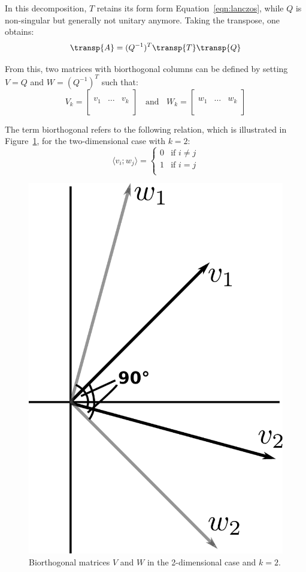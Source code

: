 \noindent In this decomposition, $T$ retains its form form Equation~\hyperref[eqn:lanczos]{\ref{eqn:lanczos}}, while $Q$ is non-singular but generally not unitary anymore. Taking the transpose, one obtains:
\begin{equation}
    \transp{A} = (Q^{-1})^T\transp{T}\transp{Q}
\end{equation}

\noindent From this, two matrices with biorthogonal columns can be defined by setting $V=Q$ and $W=(Q^{-1})^T$ such that:
\begin{equation}
  V_k =
  \left[
    \begin{array}{c|c|c}
      & &  \\
      v_1 & \dots & v_k \\
      & &  \\
    \end{array}
  \right] \;\; \text{ and }\;\;
    W_k =
  \left[
    \begin{array}{c|c|c}
      & &  \\
      w_1 & \dots & w_k \\
      & &  \\
    \end{array}
  \right]
\end{equation}

\noindent The term biorthogonal refers to the following relation, which is illustrated in Figure~\hyperref[fig:biorthogonal]{\ref{fig:biorthogonal}}, for the two-dimensional case with $k=2$:
\begin{equation}
    \langle v_i;w_j\rangle =\begin{cases}
      0 & \text{if }i \neq j\\
      1 & \text{if }i = j\\
    \end{cases}  
\end{equation}

\begin{figure}[h]
    \centering
    \includegraphics[width=0.3\linewidth]{chapters/2_solvers/2_3_iterative_solvers/figures/biorthogonal.pdf}
    \caption{Biorthogonal matrices $V$ and $W$ in the 2-dimensional case and $k=2$.}
    \label{fig:biorthogonal}
\end{figure}

